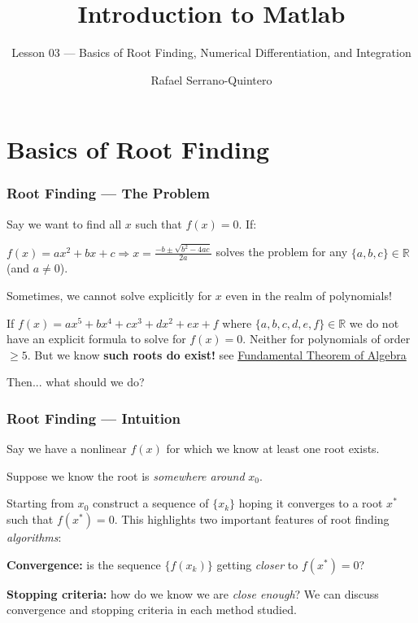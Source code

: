 \documentclass[11pt,xcolor={svgnames},aspectratio=169,usepdftitle=false]{beamer}
\title{Introduction to Matlab}
\subtitle{Lesson 03 --- Basics of Root Finding, Numerical Differentiation, and Integration}
\author{Rafael Serrano-Quintero}
\institute{Department of Economics \\ University of Barcelona}
\date{}
\let\toneitemize\itemize
\let\ttwoitemize\enditemize
\renewenvironment{itemize}{\toneitemize\addtolength{\itemsep}{0.7\baselineskip}}{\ttwoitemize}
\begin{document}
\VerbatimFootnotes

\maketitle

\section{Basics of Root Finding}

\begin{frame}
  \frametitle{Root Finding --- The Problem}
Say we want to find all $x$ such that $f(x) = 0$. If:
\begin{itemize}
  \item $f(x) = ax^2 + bx + c \Rightarrow x = \frac{-b \pm \sqrt{b^2 - 4ac}}{2a}$ solves the problem for any $\{a,b,c\}\in\mathbb{R}$ {\tiny (and $a\neq 0$)}.
  \item Sometimes, we cannot solve explicitly for $x$ even in the realm of polynomials!
  \item If $f(x) = ax^5 + bx^4 + cx^3 + dx^2 + ex + f$ where $\{a,b,c,d,e,f\}\in\mathbb{R}$ we do not have an explicit formula to solve for $f(x) = 0$. Neither for polynomials of order $\geq 5$. But we know \alert{\textbf{such roots do exist!}} {\tiny see \href{https://en.wikipedia.org/wiki/Fundamental_theorem_of_algebra}{Fundamental Theorem of Algebra}}
  \item Then... what should we do?
\end{itemize}
\end{frame}

\begin{frame}
  \frametitle{Root Finding --- Intuition}
Say we have a nonlinear $f(x)$ for which we know at least one root exists.
\begin{itemize}
  \item Suppose we know the root is \textit{somewhere around} $x_0$.
  \item Starting from $x_0$ construct a sequence of $\{x_k\}$ hoping it converges to a root $x^*$ such that $f(x^*) = 0$.
\end{itemize}
This highlights two important features of root finding \textit{algorithms}:
\begin{itemize}
  \item \alert{\textbf{Convergence:}} is the sequence $\{f(x_k)\}$ getting \textit{closer} to $f(x^*) = 0$?
  \item \alert{\textbf{Stopping criteria:}} how do we know we are \textit{close enough}?
\end{itemize}
We can discuss convergence and stopping criteria in each method studied.
\end{frame}
\end{document}
